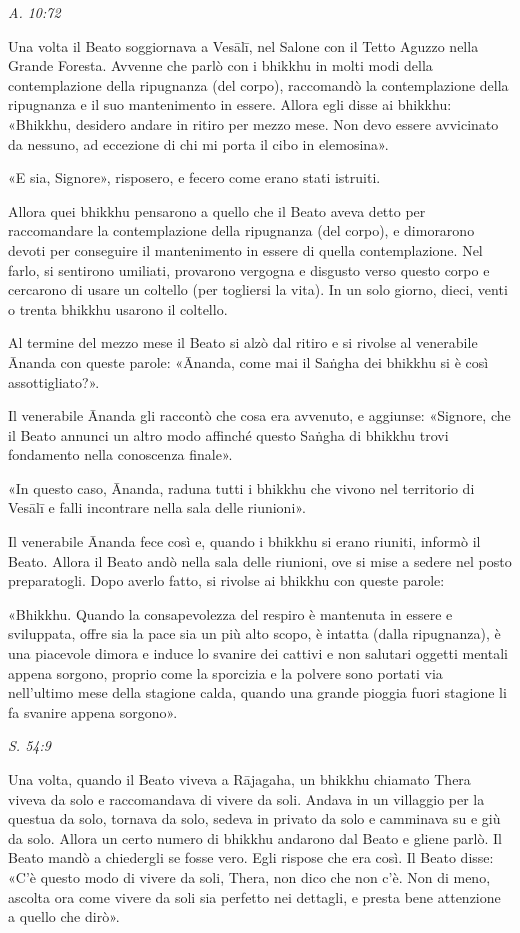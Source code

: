 \emph{A. 10:72}


Una volta il Beato soggiornava a Vesālī, nel Salone con il Tetto Aguzzo
nella Grande Foresta. Avvenne che parlò con i bhikkhu in molti modi
della contemplazione della ripugnanza (del corpo), raccomandò la
contemplazione della ripugnanza e il suo mantenimento in essere. Allora
egli disse ai bhikkhu: «Bhikkhu, desidero andare in ritiro per mezzo
mese. Non devo essere avvicinato da nessuno, ad eccezione di chi mi
porta il cibo in elemosina».


«E sia, Signore», risposero, e fecero come erano stati istruiti.


Allora quei bhikkhu pensarono a quello che il Beato aveva detto per
raccomandare la contemplazione della ripugnanza (del corpo), e
dimorarono devoti per conseguire il mantenimento in essere di quella
contemplazione. Nel farlo, si sentirono umiliati, provarono vergogna e
disgusto verso questo corpo e cercarono di usare un coltello (per
togliersi la vita). In un solo giorno, dieci, venti o trenta bhikkhu
usarono il coltello.


Al termine del mezzo mese il Beato si alzò dal ritiro e si rivolse al
venerabile Ānanda con queste parole: «Ānanda, come mai il Saṅgha dei
bhikkhu si è così assottigliato?».


Il venerabile Ānanda gli raccontò che cosa era avvenuto, e aggiunse:
«Signore, che il Beato annunci un altro modo affinché questo Saṅgha di
bhikkhu trovi fondamento nella conoscenza finale».


«In questo caso, Ānanda, raduna tutti i bhikkhu che vivono nel
territorio di Vesālī e falli incontrare nella sala delle riunioni».


Il venerabile Ānanda fece così e, quando i bhikkhu si erano riuniti,
informò il Beato. Allora il Beato andò nella sala delle riunioni, ove si
mise a sedere nel posto preparatogli. Dopo averlo fatto, si rivolse ai
bhikkhu con queste parole:


«Bhikkhu. Quando la consapevolezza del respiro è mantenuta in essere e
sviluppata, offre sia la pace sia un più alto scopo, è intatta (dalla
ripugnanza), è una piacevole dimora e induce lo svanire dei cattivi e
non salutari oggetti mentali appena sorgono, proprio come la sporcizia e
la polvere sono portati via nell’ultimo mese della stagione calda,
quando una grande pioggia fuori stagione li fa svanire appena sorgono».


\emph{S. 54:9}


Una volta, quando il Beato viveva a Rājagaha, un bhikkhu chiamato Thera
viveva da solo e raccomandava di vivere da soli. Andava in un villaggio
per la questua da solo, tornava da solo, sedeva in privato da solo e
camminava su e giù da solo. Allora un certo numero di bhikkhu andarono
dal Beato e gliene parlò. Il Beato mandò a chiedergli se fosse vero.
Egli rispose che era così. Il Beato disse: «C’è questo modo di vivere da
soli, Thera, non dico che non c’è. Non di meno, ascolta ora come vivere
da soli sia perfetto nei dettagli, e presta bene attenzione a quello che
dirò».


